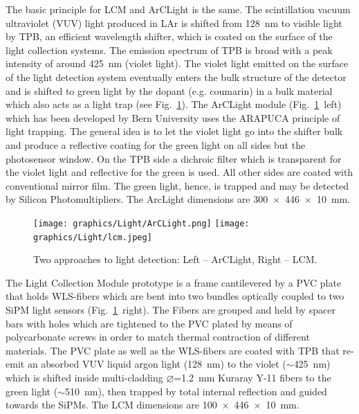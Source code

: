 The basic principle for LCM and ArCLight is the same. The scintillation vacuum ultraviolet (VUV) light produced in LAr is shifted from \SI{128}{\nano\metre} to visible light by TPB, an efficient wavelength shifter, which is coated on the surface of the light collection systems. The emission spectrum of TPB is broad with a peak intensity of around \SI{425}{\nano\metre} (violet light). The violet light emitted on the surface of the light detection system eventually enters the bulk structure of the detector and is shifted to green light by the dopant (e.g. coumarin) in a bulk material which also acts as a light trap (see Fig.~\ref{fig:fig_modules}).
The ArCLight module (Fig.~\ref{fig:fig_modules}~left) which has been developed by Bern University uses the ARAPUCA principle of light trapping. The general idea is to let the violet light go into the shifter bulk and produce a reflective coating for the green light on all sides but the photosensor window. On the TPB side a dichroic filter which is transparent for the violet light and reflective for the green is used. All other sides are coated with conventional mirror film. The green light, hence, is trapped and may be detected by Silicon Photomultipliers. The ArcLight dimensions are \SI[product-units=repeat]{300x446x10}{\milli\metre}.

\begin{figure}[htbp]
\centering 
\texttt{[image: graphics/Light/ArCLight.png]}
\qquad
\texttt{[image: graphics/Light/lcm.jpeg]}
\caption{\label{fig:fig_modules} Two approaches to light detection: Left – ArCLight, Right – LCM.}
\end{figure}


The Light Collection Module prototype is a frame cantilevered by a PVC plate that holds WLS-fibers which are bent into two bundles optically coupled to two SiPM light sensors (Fig.~\ref{fig:fig_modules}~right). The Fibers are grouped and held by spacer bars with holes which are tightened to the PVC plated by means of polycarbonate screws in order to match thermal contraction of different materials. The PVC plate as well as the WLS-fibers are coated with TPB that re-emit an absorbed VUV liquid argon light (\SI{128}{\nano\metre}) to the violet ($\sim$\SI{425}{\nano\metre}) which is shifted inside multi-cladding $\varnothing$=\SI{1.2}{\milli\metre} Kuraray Y-11 fibers to the green light ($\sim$\SI{510}{\nano\metre}), then trapped by total internal reflection and guided towards the SiPMs.  The LCM dimensions are \SI[product-units=repeat]{100x446x10}{\milli\metre}.


